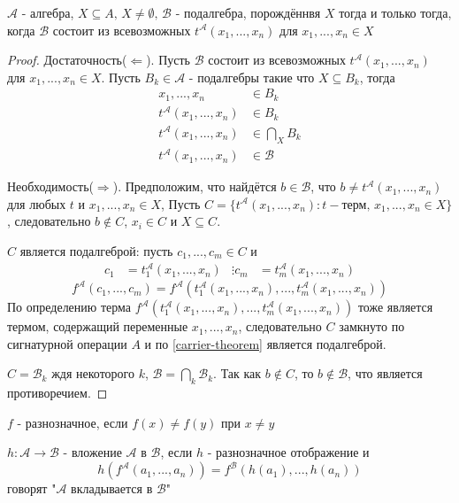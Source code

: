 \documentclass[../main/document.tex]{subfiles}
\begin{document}
\begin{thm}
$\mathcal{A}$ - алгебра, $X\subseteq A,\,X\neq\emptyset,\,\mathcal{B}$ - подалгебра, порождённвя $X$ тогда и только тогда, когда $\mathcal{B}$ состоит из всевозможных $t^{\mathcal{A}}(x_1,...,x_n)$ для $x_1,...,x_n\in X$
\begin{proof}
Достаточность($\Leftarrow$). Пусть $\mathcal{B}$ состоит из всевозможных $t^{\mathcal{A}}(x_1,...,x_n)$ для $x_1,...,x_n\in X$. Пусть $B_k\in \mathcal{A}$ - подалгебры такие что $X\subseteq B_k$, тогда
\begin{align*}
x_1,...,x_n&\in B_k\\
t^{\mathcal{A}}(x_1,...,x_n)&\in B_k\\
t^{\mathcal{A}}(x_1,...,x_n)&\in \bigcap\limits_X B_k\\
t^{\mathcal{A}}(x_1,...,x_n)&\in \mathcal{B}
\end{align*}

Необходимость($\Rightarrow$). Предположим, что найдётся $b\in \mathcal{B}$, что $b\neq t^{\mathcal{A}}(x_1,...,x_n)$ для любых $t$ и $x_1,...,x_n\in X$, 
Пусть $C=\{t^{\mathcal{A}}(x_1,...,x_n): t - \text{терм, }x_1,...,x_n\in X\}$, следовательно $b\not\in C$, $x_i\in C$ и $X\subseteq C$. 

$C$ является подалгеброй: пусть $c_1,...,c_m\in C$ и
\begin{align*}
c_1&=t_1^{\mathcal{A}}(x_1,...,x_n)
&\vdots
c_m&=t_m^{\mathcal{A}}(x_1,...,x_n)
\end{align*}
$$f^{\mathcal{A}}(c_1,...,c_m)=f^{\mathcal{A}}(t_1^{\mathcal{A}}(x_1,...,x_n),...,t_m^{\mathcal{A}}(x_1,...,x_n))$$
По определению терма $f^{\mathcal{A}}(t_1^{\mathcal{A}}(x_1,...,x_n),...,t_m^{\mathcal{A}}(x_1,...,x_n))$ тоже является термом, содержащий переменные $x_1,...,x_n$, следовательно $C$ замкнуто по сигнатурной операции $A$ и по \ref{carrier-theorem} является подалгеброй.

$C=\mathcal{B}_k$ ждя некоторого $k$, $\mathcal{B}=\bigcap\limits_k \mathcal{B}_k$. Так как $b\not\in C$, то $b\not\in \mathcal{B}$, что является противоречием.
\end{proof}
\end{thm}
\begin{dfn}
$f$ - разнозначное, если $f(x)\neq f(y)$ при $x\neq y$
\end{dfn}
\begin{dfn}[Вложение]
$h:\mathcal{A}\rightarrow \mathcal{B}$ - вложение $\mathcal{A}$ в $\mathcal{B}$, если $h$ - разнозначное отображение и
$$h(f^{\mathcal{A}}(a_1,...,a_n))=f^{\mathcal{B}}(h(a_1),...,h(a_n))$$
говорят "$\mathcal{A}$ вкладывается в $\mathcal{B}$"
\end{dfn}
\end{document}
